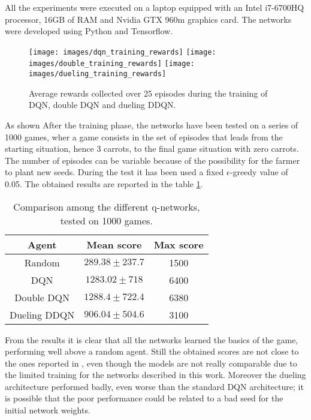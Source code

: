 \documentclass[article,11pt]{article}
\begin{document}
	All the experiments were executed on a laptop equipped with an Intel i7-6700HQ processor, 16GB of RAM and Nvidia GTX 960m graphics card. The networks were developed using Python and Tensorflow.
	
	\begin{figure}
		\texttt{[image: images/dqn\_training\_rewards]}
		\endminipage\hfill
		\texttt{[image: images/double\_training\_rewards]}
		\endminipage\hfill
		\texttt{[image: images/dueling\_training\_rewards]}
		\endminipage
		\label{fig:average_reward}
		\caption{Average rewards collected over 25 episodes during the training of DQN, double DQN and dueling DDQN.}
	\end{figure}
	As shown
	After the training phase, the networks have been tested on a series of 1000 games, wher a game consists in the set of episodes that leads from the starting situation, hence 3 carrots, to the final game situation with zero carrots. The number of episodes can be variable because of the possibility for the farmer to plant new seeds. During the test it has been used a fixed $\epsilon$-greedy value of 0.05.
	The obtained results are reported in the table \ref{tab:test}.
	\begin{table}
		\centering
		\begin{tabular}{|c|c|c|}
			\hline
			Agent	& Mean score & Max score\\
			\hline
			Random & $289.38 \pm 237.7$ & 1500 \\
			DQN & $1283.02 \pm 718$ & 6400\\
			Double DQN & $1288.4 \pm 722.4$ & 6380 \\
			Dueling DDQN & $906.04 \pm 504.6$ & 3100 \\
			\hline
		\end{tabular}
		\caption{Comparison among the different q-networks, tested on 1000 games.}
		\label{tab:test}
	\end{table}

	From the results it is clear that all the networks learned the basics of the game, performing well above a random agent. Still the obtained scores are not close to the ones reported in \cite{combined_dqn}, even though the models are not really comparable due to the limited training for the networks described in this work. Moreover the dueling architecture performed badly, even worse than the standard DQN architecture; it is possible that the poor performance could be related to a bad seed for the initial network weights.
	
\end{document}
